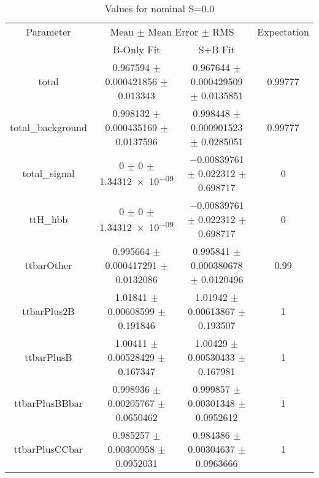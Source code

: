 \begin{table}
\centering
\caption{Values for nominal S=0.0}
\begin{tabular}{cccc}
\toprule
Parameter & \multicolumn{2}{c}{Mean $\pm$ Mean Error $\pm$ RMS} & Expectation\\
 & B-Only Fit & S+B Fit & \\
\midrule
total & \num{0.967594} $\pm$ \num{0.000421856} $\pm$ \num{0.013343} & \num{0.967644} $\pm$ \num{0.000429509} $\pm$ \num{0.0135851} & \num{0.99777}\\
total\_background & \num{0.998132} $\pm$ \num{0.000435169} $\pm$ \num{0.0137596} & \num{0.998448} $\pm$ \num{0.000901523} $\pm$ \num{0.0285051} & \num{0.99777}\\
total\_signal & \num{0} $\pm$ \num{0} $\pm$ \num{1.34312e-09} & \num{-0.00839761} $\pm$ \num{0.022312} $\pm$ \num{0.698717} & \num{0}\\
ttH\_hbb & \num{0} $\pm$ \num{0} $\pm$ \num{1.34312e-09} & \num{-0.00839761} $\pm$ \num{0.022312} $\pm$ \num{0.698717} & \num{0}\\
ttbarOther & \num{0.995664} $\pm$ \num{0.000417291} $\pm$ \num{0.0132086} & \num{0.995841} $\pm$ \num{0.000380678} $\pm$ \num{0.0120496} & \num{0.99}\\
ttbarPlus2B & \num{1.01841} $\pm$ \num{0.00608599} $\pm$ \num{0.191846} & \num{1.01942} $\pm$ \num{0.00613867} $\pm$ \num{0.193507} & \num{1}\\
ttbarPlusB & \num{1.00411} $\pm$ \num{0.00528429} $\pm$ \num{0.167347} & \num{1.00429} $\pm$ \num{0.00530433} $\pm$ \num{0.167981} & \num{1}\\
ttbarPlusBBbar & \num{0.998936} $\pm$ \num{0.00205767} $\pm$ \num{0.0650462} & \num{0.999857} $\pm$ \num{0.00301348} $\pm$ \num{0.0952612} & \num{1}\\
ttbarPlusCCbar & \num{0.985257} $\pm$ \num{0.00300958} $\pm$ \num{0.0952031} & \num{0.984386} $\pm$ \num{0.00304637} $\pm$ \num{0.0963666} & \num{1}\\
\bottomrule
\end{tabular}
\end{table}